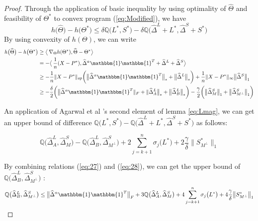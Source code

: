 \documentclass[AMS,STIX1COL]{WileyNJD-v2}
\begin{document}
{\begin{proof}
Through the application of basic inequality by using optimality of $\widehat{\Theta}$ and feasibility of $\Theta^{*}$ to convex program (\ref{eq:Modified}), we have
\begin{equation}
    h\big(\widehat{\Theta}\big) - h\big(\Theta^{*}\big)
    \leq \delta \mathbb{Q}\big(L^{*},S^{*}\big) - \delta \mathbb{Q}\big(\widehat{\Delta}^L + L^{*},\widehat{\Delta}^S + S^{*}\big)
\end{equation}
By using convexity of $h(\Theta)$, we can write
\begin{align}
    h\big(\widehat{\Theta}\big)-h\big(\Theta^{*}\big) &\geq
    \big\langle\, \nabla_{\Theta}h(\Theta^{*}),\widehat{\Theta}-\Theta^{*}\big\rangle\ \nonumber \\
    &= - \big\langle\,\frac{1}{n} (X-P^{*}), \widehat{\Delta}^{\alpha}\mathbbm{1}\mathbbm{1}^T + \widehat{\Delta}^{L} + \widehat{\Delta}^{S} \big\rangle\ \nonumber \\
    &\geq -\frac{1}{n} \|X - P^*\|_{op}\bigg(\big\|\widehat{\Delta}^{\alpha}\mathbbm{1}\mathbbm{1}^T\big\|_\ast + \big\|\widehat{\Delta}^{L}\big\|_\ast\bigg) +  \frac{1}{n} \|X - P^*\|_{\infty}\big\|\widehat{\Delta}^{S}\big\|_{1} \nonumber \\
    &\geq -\frac{\delta}{2}\bigg(\big\|\widehat{\Delta}^{\alpha}\mathbbm{1}\mathbbm{1}^T\|_F + \|\widehat{\Delta}^{L}_{A}\big\|_\ast + \big\|\widehat{\Delta}^{L}_{B}\big\|_\ast\bigg) - \frac{\gamma}{2} \bigg(\big\|\widehat{\Delta}^{S}_{M}\big\|_{1} +
    \big\|\widehat{\Delta}^{S}_{M^\perp}\big\|_{1}\bigg) \label{eq:27}
\end{align}

An application of Agarwal et al \cite{agarwal2012noisy}'s second element of lemma \ref{eq:Lmag},
we can get an upper bound of difference $\mathbb{Q}\big(L^*,S^*\big)- \mathbb{Q}\big(\widehat{\Delta}^L + L^{*},\widehat{\Delta}^S + S^{*}\big)$ as follows:

\begin{equation} \label{eq:28}
    \mathbb{Q}\big(\widehat{\Delta}^L_{A},\widehat{\Delta}^S_{M}\big) - \mathbb{Q}\big(\widehat{\Delta}^L_{B},\widehat{\Delta}^S_{M^\perp}\big)
    +2 \sum_{j=k+1}^{n} \sigma_{j}\big(L^*\big) + 2\frac{\gamma}{\delta}\big\|S^*_{M^\perp}\big\|_{1}
\end{equation}

By combining relations (\ref{eq:27}) and (\ref{eq:28}), we can get the upper bound of $\mathbb{Q}\big(\widehat{\Delta}^L_{B},\widehat{\Delta}^S_{M^\perp}\big)$ :
\begin{align*}
    \mathbb{Q}\big(\widehat{\Delta}^L_{B},\widehat{\Delta}^S_{M^\perp}\big) \leq
    \big\|\widehat{\Delta}^{\alpha}\mathbbm{1}\mathbbm{1}^T\big\|_{F} +
    3\mathbb{Q}\big(\widehat{\Delta}^{L}_{A},\widehat{\Delta}^{S}_{M}\big)+4 \sum_{j=k+1}^{n} \sigma_{j}\big(L^{*}\big) + 4\frac{\gamma}{\delta}
    \big\|S^{*}_{M^\perp}\big\|_{1}
\end{align*}
\end{proof}

}
\end{document}
